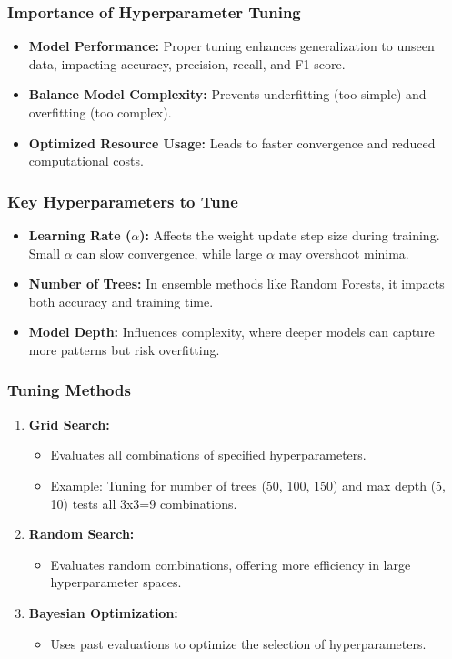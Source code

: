 \documentclass{beamer}
\begin{document}
\begin{frame}[fragile]
    \frametitle{Importance of Hyperparameter Tuning}
    \begin{itemize}
        \item \textbf{Model Performance:} Proper tuning enhances generalization to unseen data, impacting accuracy, precision, recall, and F1-score.
        \item \textbf{Balance Model Complexity:} Prevents underfitting (too simple) and overfitting (too complex).
        \item \textbf{Optimized Resource Usage:} Leads to faster convergence and reduced computational costs.
    \end{itemize}
\end{frame}

\begin{frame}[fragile]
    \frametitle{Key Hyperparameters to Tune}
    \begin{itemize}
        \item \textbf{Learning Rate ($\alpha$):} Affects the weight update step size during training. Small $\alpha$ can slow convergence, while large $\alpha$ may overshoot minima.
        \item \textbf{Number of Trees:} In ensemble methods like Random Forests, it impacts both accuracy and training time.
        \item \textbf{Model Depth:} Influences complexity, where deeper models can capture more patterns but risk overfitting.
    \end{itemize}
\end{frame}

\begin{frame}[fragile]
    \frametitle{Tuning Methods}
    \begin{enumerate}
        \item \textbf{Grid Search:} 
            \begin{itemize}
                \item Evaluates all combinations of specified hyperparameters.
                \item Example: Tuning for number of trees (50, 100, 150) and max depth (5, 10) tests all 3x3=9 combinations.
            \end{itemize}
        \item \textbf{Random Search:} 
            \begin{itemize}
                \item Evaluates random combinations, offering more efficiency in large hyperparameter spaces.
            \end{itemize}
        \item \textbf{Bayesian Optimization:} 
            \begin{itemize}
                \item Uses past evaluations to optimize the selection of hyperparameters.
            \end{itemize}
    \end{enumerate}
\end{frame}
\end{document}
